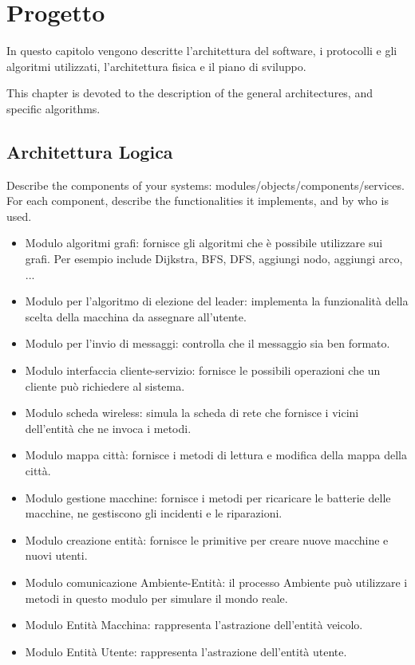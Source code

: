 
\chapter{Progetto} \label{progetto}

In questo capitolo vengono descritte l'architettura del software, i protocolli e gli algoritmi utilizzati, l'architettura fisica e il piano di sviluppo.

This chapter is devoted to the description of the general architectures, and specific algorithms.

\section{Architettura Logica}
Describe the components of your systems: modules/objects/components/services. For each component, describe the functionalities it implements, and by who is used.

\begin{itemize}
	\item Modulo algoritmi grafi: fornisce gli algoritmi che è possibile utilizzare sui grafi. Per esempio include Dijkstra, BFS, DFS, aggiungi nodo, aggiungi arco, ... 
	
	\item Modulo per l'algoritmo di elezione del leader: implementa la funzionalità della scelta della macchina da assegnare all'utente.
	
	\item Modulo per l'invio di messaggi: controlla che il messaggio sia ben formato.
	
	\item Modulo interfaccia cliente-servizio: fornisce le possibili operazioni che un cliente può richiedere al sistema.
	
	\item Modulo scheda wireless: simula la scheda di rete che fornisce i vicini dell'entità che ne invoca i metodi.
	
	\item Modulo mappa città: fornisce i metodi di lettura e modifica della mappa della città.
	
	\item Modulo gestione macchine: fornisce i metodi per ricaricare le batterie delle macchine, ne gestiscono gli incidenti e le riparazioni.
	
	\item Modulo creazione entità: fornisce le primitive per creare nuove macchine e nuovi utenti.
	
	\item Modulo comunicazione Ambiente-Entità: il processo Ambiente può utilizzare i metodi in questo modulo per simulare il mondo reale.
	
	\item Modulo Entità Macchina: rappresenta l'astrazione dell'entità veicolo.
	
	\item Modulo Entità Utente: rappresenta l'astrazione dell'entità utente.

\end{itemize}

